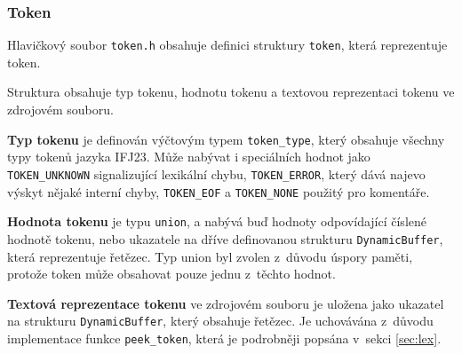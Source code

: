 \documentclass[a4paper, 11pt]{article}
\begin{document}
	\newpage
	\subsubsection{Token}
	Hlavičkový soubor \texttt{token.h} obsahuje definici struktury \texttt{token}, která reprezentuje token.
	\par\noindent Struktura obsahuje typ tokenu, hodnotu tokenu a textovou reprezentaci tokenu ve zdrojovém souboru. 
	\par\noindent \textbf{Typ tokenu} je definován výčtovým typem \texttt{token\_type}, který obsahuje všechny typy tokenů jazyka IFJ23. Může nabývat i speciálních hodnot jako \texttt{TOKEN\_UNKNOWN} signalizující lexikální chybu, \texttt{TOKEN\_ERROR}, který dává najevo výskyt nějaké interní chyby, \texttt{TOKEN\_EOF} a \texttt{TOKEN\_NONE} použitý pro komentáře.
	\par\noindent \textbf{Hodnota tokenu} je typu \texttt{union}, a nabývá buď hodnoty odpovídající číslené hodnotě tokenu, nebo ukazatele na dříve definovanou strukturu \texttt{DynamicBuffer}, která reprezentuje řetězec.
	Typ union byl zvolen z~důvodu úspory paměti, protože token může obsahovat pouze jednu z~těchto hodnot.
	\par\noindent \textbf{Textová reprezentace tokenu} ve zdrojovém souboru je uložena jako ukazatel na strukturu \texttt{DynamicBuffer}, který obsahuje řetězec.
	Je uchovávána z~důvodu implementace funkce \texttt{peek\_token}, která je podrobněji popsána v~sekci \ref{sec:lex}.
\end{document}
